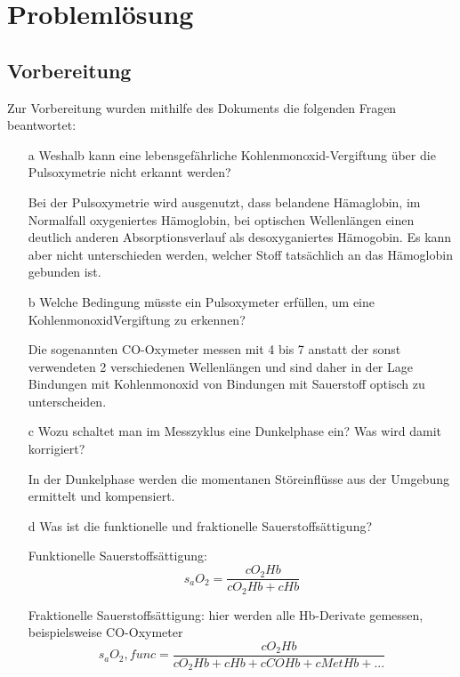 \documentclass[11pt]{scrartcl}
\begin{document}
    \section{Problemlösung}

    \subsection{Vorbereitung}
    Zur Vorbereitung wurden mithilfe des Dokuments \cite{Pulsoxymetrie} die folgenden Fragen beantwortet:
    
    \begin{itemize}
        \item[a]  Weshalb kann eine lebensgefährliche Kohlenmonoxid-Vergiftung über die
        Pulsoxymetrie nicht erkannt werden?
        \item[] Bei der Pulsoxymetrie wird ausgenutzt, dass belandene Hämaglobin, im Normalfall oxygeniertes Hämoglobin, 
        bei optischen Wellenlängen einen deutlich anderen Absorptionsverlauf als desoxyganiertes Hämogobin. 
        Es kann aber nicht unterschieden werden, welcher Stoff tatsächlich an das Hämoglobin gebunden ist.
        \item[b] Welche Bedingung müsste ein Pulsoxymeter erfüllen, um eine KohlenmonoxidVergiftung zu erkennen?
        \item[]  Die sogenannten CO-Oxymeter messen mit 4 bis 7 anstatt der sonst verwendeten 2 verschiedenen Wellenlängen und sind daher in der 
        Lage Bindungen mit Kohlenmonoxid von Bindungen mit Sauerstoff optisch zu unterscheiden.
        \item[c] Wozu schaltet man im Messzyklus eine Dunkelphase ein? Was wird damit
        korrigiert?
        \item[] In der Dunkelphase werden die momentanen Störeinflüsse aus der Umgebung ermittelt und kompensiert.
        \item[d] Was ist die funktionelle und fraktionelle Sauerstoffsättigung?
        \item[] Funktionelle Sauerstoffsättigung: 
        \begin{equation}
            s_aO_2 = \frac{cO_2Hb}{cO_2Hb + cHb} 
        \end{equation}
        \item[] Fraktionelle Sauerstoffsättigung: hier werden alle Hb-Derivate gemessen, beispielsweise CO-Oxymeter
        \begin{equation}
            s_aO_2,func = \frac{cO_2Hb}{cO_2Hb + cHb + cCOHb + cMetHb + ...} 

\end{equation}
\end{itemize}
\end{document}

